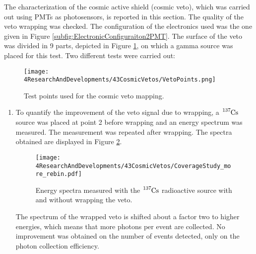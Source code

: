 The characterization of the cosmic active shield (cosmic veto), which was carried out using PMTs as photosensors, is reported in this section. The quality of the veto wrapping was checked. The configuration of the electronics used was the one given in Figure \ref{subfig:ElectronicConfiguraiton2PMT}. The surface of the veto was divided in 9 parts, depicted in Figure \ref{fig:MappingPoints}, on which a gamma source was placed for this test. Two different tests were carried out:

\begin{figure}[h]
\centering
\texttt{[image: 4ResearchAndDevelopments/43CosmicVetos/VetoPoints.png]}
\caption{Test points used for the cosmic veto mapping.\label{fig:MappingPoints}}
\end{figure}
\begin{enumerate}

\item{} To quantify the improvement of the veto signal due to wrapping, a $\ce{^{137}Cs}$ source was placed at point 2 before wrapping and an energy spectrum was measured. The measurement was repeated after wrapping. The spectra obtained are displayed in Figure \ref{fig:VetoCoverageImprovement}.

\begin{figure}[h]
\centering
\texttt{[image: 4ResearchAndDevelopments/43CosmicVetos/CoverageStudy\_more\_rebin.pdf]}
\caption{Energy spectra measured with the $\ce{^{137}Cs}$ radioactive source with and without wrapping the veto.\label{fig:VetoCoverageImprovement}}
\end{figure}

The spectrum of the wrapped veto is shifted about a factor two to higher energies, which means that more photons per event are collected. No improvement was obtained on the number of events detected, only on the photon collection efficiency.



\end{enumerate}
